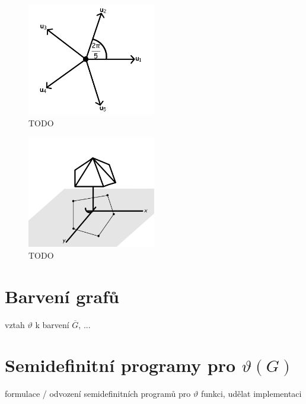 \begin{figure}[h!]
    \centering
    \includegraphics[width=0.5\textwidth]{img/umbrella_projection.png} 
    \caption{TODO}
\end{figure}

\begin{figure}[h!]
    \centering
    \includegraphics[width=0.5\textwidth]{img/umbrella.png} 
    \caption{TODO}
\end{figure}


\section{Barvení grafů}
vztah $\vartheta$ k barvení $\overline{G}$, ...


\section{Semidefinitní programy pro $\vartheta(G)$}

formulace / odvození semidefinitních programů pro $\vartheta$ funkci, udělat implementaci
